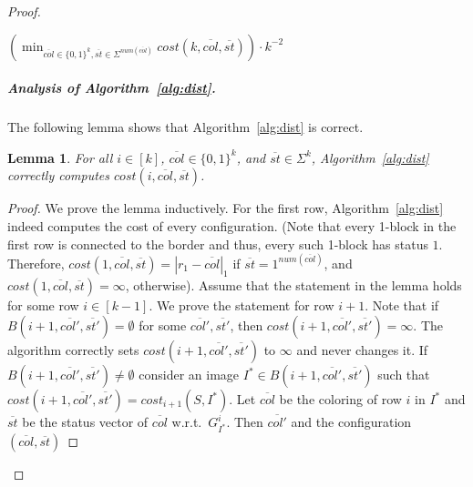 \documentclass[11pt,english]{article}
\newtheorem{lemma}[theorem]{Lemma}
\numberwithin{figure}{section}
\begin{document}
\begin{proof}
\begin{algorithm}
{}
\nl \label{st:actual-min}\Return $(\min_{\overline{col}\in\{0,1\}^k, \overline{st}\in\Sigma^{num(\overline{col})}}cost(k,\overline{col}, \overline{st}))\cdot k^{-2}$
\end{algorithm}

\subparagraph{Analysis of Algorithm~\ref{alg:dist}.}
The following lemma shows that Algorithm~\ref{alg:dist} is correct.
\begin{lemma}
\label{lm:correct}
For all $i\in[k]$, $\overline{col}\in\{0,1\}^k$, and $\overline{st}\in\Sigma^{k}$, Algorithm~\ref{alg:dist} correctly computes ${cost}(i,\overline{col}, \overline{st})$.
\end{lemma}
\begin{proof} We prove the lemma inductively. For the first row, Algorithm~\ref{alg:dist} indeed computes the cost of every configuration. (Note that every 1-block in the first row is connected to the border and thus, every such 1-block has status $1$. Therefore, $cost(1,\overline{col},\overline{st})=|r_1-\overline{col}|_1$ if $\overline{st}=1^{num(\overline{col})}$, and $cost(1,\overline{col},\overline{st})=\infty$, otherwise). Assume that the statement in the lemma holds for some row $i\in[k-1]$. We prove the statement for row $i+1$. Note that if $B(i+1,\overline{col'},\overline{st'})=\emptyset$ for some $\overline{col'},\overline{st'}$, then $cost(i+1,\overline{col'},\overline{st'})=\infty$. The algorithm correctly sets $cost(i+1,\overline{col'},\overline{st'})$ to $\infty$ and never changes it. If $B(i+1,\overline{col'},\overline{st'})\neq\emptyset$ consider an image $I^*\in B(i+1,\overline{col'},\overline{st'})$ such that $cost(i+1,\overline{col'},\overline{st'})=cost_{i+1}(S,I^*)$. Let $\overline{col}$ be the coloring of row $i$ in $I^*$ and $\overline{st}$ be the status vector of $\overline{col}$ w.r.t.\ $G^i_{I^*}$. Then $\overline{col'}$ and the configuration $(\overline{col},\overline{st})$

\end{proof}
\end{proof}
\end{document}
